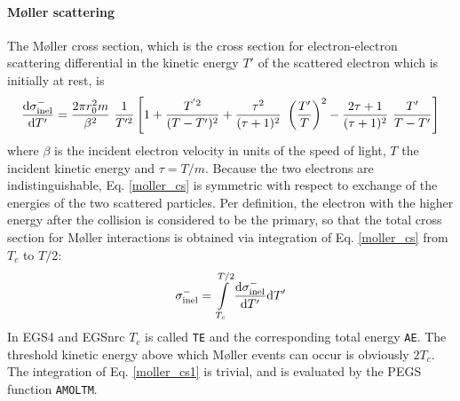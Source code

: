 \paragraph{M{\o}ller scattering} \hfill
{}

The M{\o}ller cross section, which is the cross section
for electron-electron scattering differential in the kinetic energy
$T'$ of the scattered electron which is initially at rest, is
\cite{ICRU37}
\begin{equation}
\label{moller_cs}
{{\rm d} \sigma_{\rm inel}^- \over  {\rm d}T'} =
{2 \pi r_0^2 m \over \beta^2}~\frac{1}{T^{\prime 2}} \left[
1 + {T^{' 2} \over (T - T')^2} + {\tau^2 \over (\tau+1)^2}~
\left(\frac{T'}{T}\right)^2
- {2 \tau + 1 \over (\tau + 1)^2}~{T' \over T - T'} \right]
\end{equation}
where $\beta$ is the incident electron velocity in units of the
speed of light, $T$ the incident kinetic energy and $\tau = T/m$.
Because the two electrons are indistinguishable, Eq. \eqref{moller_cs}
is symmetric with respect to exchange of the energies of the two scattered
particles. Per definition, the electron with the higher energy
after the collision is considered to be the primary, so that
the total cross section for M{\o}ller interactions is obtained
via integration of Eq. \eqref{moller_cs} from $T_c$ to $T/2$:
\begin{equation}
\label{moller_cs1}
\sigma_{\rm inel}^- = \int\limits_{T_c}^{T/2}
{{\rm d} \sigma_{\rm inel}^- \over  {\rm d}T'} {\rm d}T'
\end{equation}
In EGS4 and EGSnrc $T_c$ is called {\tt TE} and the corresponding
total energy {\tt AE}. The threshold kinetic energy above which M{\o}ller
events can occur is obviously $2 T_c$. The integration of
Eq. \eqref{moller_cs1} is trivial, and is evaluated by the
PEGS function {\tt AMOLTM}.

